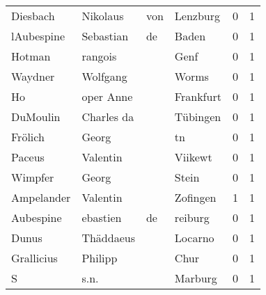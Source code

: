 \documentclass[10pt,a4paper,landscape]{article}
\begin{document}
\begin{longtable}{llllrr}
                 Diesbach &                           Nikolaus &         von &                                    Lenzburg &          0 &         1 \\
               lAubespine &                          Sebastian &          de &                                       Baden &          0 &         1 \\
                   Hotman &                            rangois &             &                                        Genf &          0 &         1 \\
                  Waydner &                           Wolfgang &             &                                       Worms &          0 &         1 \\
                       Ho &                          oper Anne &             &                                   Frankfurt &          0 &         1 \\
                 DuMoulin &                         Charles da &             &                                    Tübingen &          0 &         1 \\
                  Frölich &                              Georg &             &                                          tn &          0 &         1 \\
                   Paceus &                           Valentin &             &                                     Viikewt &          0 &         1 \\
                  Wimpfer &                              Georg &             &                                       Stein &          0 &         1 \\
               Ampelander &                           Valentin &             &                                    Zofingen &          1 &         1 \\
                Aubespine &                           ebastien &          de &                                     reiburg &          0 &         1 \\
                    Dunus &                          Thäddaeus &             &                                     Locarno &          0 &         1 \\
               Grallicius &                            Philipp &             &                                        Chur &          0 &         1 \\
                        S &                               s.n. &             &                                     Marburg &          0 &         1 \\

\end{longtable}
\end{document}
